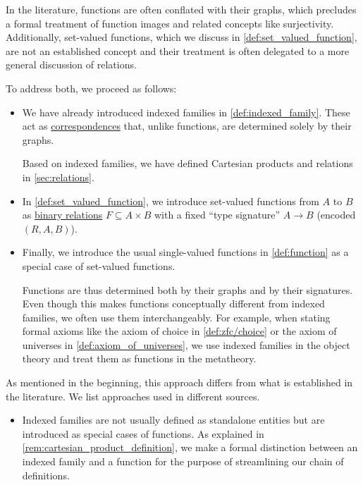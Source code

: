 \begin{remark}\label{rem:function_definition}
  In the literature, functions are often conflated with their graphs, which precludes a formal treatment of function images and related concepts like surjectivity. Additionally, set-valued functions, which we discuss in \cref{def:set_valued_function}, are not an established concept and their treatment is often delegated to a more general discussion of relations.

  To address both, we proceed as follows:
  \begin{itemize}
    \item We have already introduced indexed families in \cref{def:indexed_family}. These act as \hyperref[con:variable_dependence]{correspondences} that, unlike functions, are determined solely by their graphs.

    Based on indexed families, we have defined Cartesian products and relations in \cref{sec:relations}.

    \item In \cref{def:set_valued_function}, we introduce set-valued functions from \( A \) to \( B \) as \hyperref[def:binary_relation]{binary relations} \( F \subseteq A \times B \) with a fixed \enquote{type signature} \( A \to B \) (encoded \( (R, A, B) \)).

    \item Finally, we introduce the usual single-valued functions in \cref{def:function} as a special case of set-valued functions.

    Functions are thus determined both by their graphs and by their signatures. Even though this makes functions conceptually different from indexed families, we often use them interchangeably. For example, when stating formal axioms like the axiom of choice in \cref{def:zfc/choice} or the axiom of universes in \cref{def:axiom_of_universes}, we use indexed families in the object theory and treat them as functions in the metatheory.
  \end{itemize}

  As mentioned in the beginning, this approach differs from what is established in the literature. We list approaches used in different sources.
  \begin{itemize}
    \item Indexed families are not usually defined as standalone entities but are introduced as special cases of functions. As explained in \cref{rem:cartesian_product_definition}, we make a formal distinction between an indexed family and a function for the purpose of streamlining our chain of definitions.


\end{itemize}
\end{remark}
